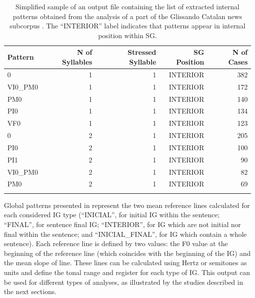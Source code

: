 \documentclass[output=paper]{langsci/langscibook}
\begin{document}
\begin{table}
\begin{tabularx}{\textwidth}{Xrrrr}
\lsptoprule

Pattern & N of Syllables & Stressed Syllable & SG Position & N of Cases \\
\midrule
0 & 1 & 1 & INTERIOR & 382 \\
VI0\_PM0 & 1 & 1 & INTERIOR & 172 \\
PM0 & 1 & 1 & INTERIOR & 140 \\
PI0 & 1 & 1 & INTERIOR & 134 \\
VF0 & 1 & 1 & INTERIOR & 123 \\
0 & 2 & 1 & INTERIOR & 205 \\
PI0 & 2 & 1 & INTERIOR & 100 \\
PI1 & 2 & 1 & INTERIOR & 90 \\
VI0\_PM0 & 2 & 1 & INTERIOR & 82 \\
PM0 & 2 & 1 & INTERIOR & 69 \\
\lspbottomrule
\end{tabularx}
\caption{Simplified sample of an output file containing the list of extracted internal patterns obtained from the analysis of a part of the Glissando Catalan news subcorpus \citep{Garrido2013Glissando}. The ``INTERIOR'' label indicates that patterns appear in internal position within SG.}
\label{tab:gar:5}
\end{table}

\begin{samepage}

Global patterns presented in  represent the two mean reference lines calculated for each considered IG type (``INICIAL'', for initial IG within the sentence; ``FINAL'', for sentence final IG; ``INTERIOR'', for IG which are not initial nor final within the sentence; and ``INICIAL\_FINAL'', for IG which contain a whole sentence). Each reference line is defined by two values: the F0 value at the beginning of the reference line (which coincides with the beginning of the IG) and the mean slope of line. These lines can be calculated using Hertz or semitones as units and define the tonal range and register for each type of IG. This output can be used for different types of analyses, as illustrated by the studies described in the next sections.

\end{samepage}
\end{document}

